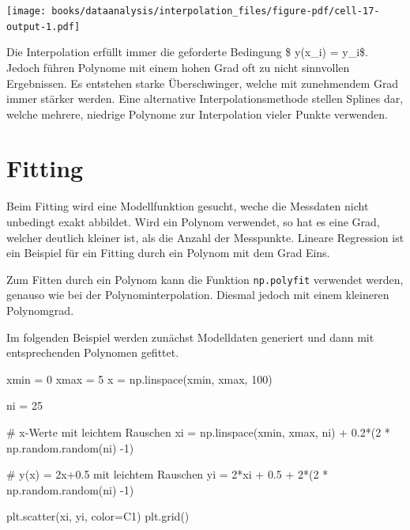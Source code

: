 \documentclass[
  letterpaper,
  DIV=11,
  numbers=noendperiod]{scrreprt}
\newenvironment{Shaded}{\begin{snugshade}}{\end{snugshade}}
\newcommand{\CommentTok}[1]{\textcolor[rgb]{0.37,0.37,0.37}{#1}}
\newcommand{\DecValTok}[1]{\textcolor[rgb]{0.68,0.00,0.00}{#1}}
\newcommand{\FloatTok}[1]{\textcolor[rgb]{0.68,0.00,0.00}{#1}}
\newcommand{\NormalTok}[1]{\textcolor[rgb]{0.00,0.23,0.31}{#1}}
\newcommand{\OperatorTok}[1]{\textcolor[rgb]{0.37,0.37,0.37}{#1}}
\newcommand{\StringTok}[1]{\textcolor[rgb]{0.13,0.47,0.30}{#1}}
\begin{document}
\texttt{[image: books/dataanalysis/interpolation\_files/figure-pdf/cell-17-output-1.pdf]}

Die Interpolation erfüllt immer die geforderte Bedingung \$ y(x\_i) =
y\_i\$. Jedoch führen Polynome mit einem hohen Grad oft zu nicht
sinnvollen Ergebnissen. Es entstehen starke Überschwinger, welche mit
zunehmendem Grad immer stärker werden. Eine alternative
Interpolationsmethode stellen Splines dar, welche mehrere, niedrige
Polynome zur Interpolation vieler Punkte verwenden.

\chapter{Fitting}\label{fitting}

Beim Fitting wird eine Modellfunktion gesucht, weche die Messdaten nicht
unbedingt exakt abbildet. Wird ein Polynom verwendet, so hat es eine
Grad, welcher deutlich kleiner ist, als die Anzahl der Messpunkte.
Lineare Regression ist ein Beispiel für ein Fitting durch ein Polynom
mit dem Grad Eins.

Zum Fitten durch ein Polynom kann die Funktion \texttt{np.polyfit}
verwendet werden, genauso wie bei der Polynominterpolation. Diesmal
jedoch mit einem kleineren Polynomgrad.

Im folgenden Beispiel werden zunächst Modelldaten generiert und dann mit
entsprechenden Polynomen gefittet.

\begin{Shaded}
\begin{Highlighting}[]
\NormalTok{xmin }\OperatorTok{=} \DecValTok{0}
\NormalTok{xmax }\OperatorTok{=} \DecValTok{5}
\NormalTok{x }\OperatorTok{=}\NormalTok{ np.linspace(xmin, xmax, }\DecValTok{100}\NormalTok{)}

\NormalTok{ni }\OperatorTok{=} \DecValTok{25}

\CommentTok{\# x{-}Werte mit leichtem Rauschen}
\NormalTok{xi }\OperatorTok{=}\NormalTok{ np.linspace(xmin, xmax, ni) }\OperatorTok{+} \FloatTok{0.2}\OperatorTok{*}\NormalTok{(}\DecValTok{2} \OperatorTok{*}\NormalTok{ np.random.random(ni) }\OperatorTok{{-}}\DecValTok{1}\NormalTok{)}

\CommentTok{\# y(x) = 2x+0.5 mit leichtem Rauschen}
\NormalTok{yi }\OperatorTok{=} \DecValTok{2}\OperatorTok{*}\NormalTok{xi }\OperatorTok{+} \FloatTok{0.5} \OperatorTok{+} \DecValTok{2}\OperatorTok{*}\NormalTok{(}\DecValTok{2} \OperatorTok{*}\NormalTok{ np.random.random(ni) }\OperatorTok{{-}}\DecValTok{1}\NormalTok{)}

\NormalTok{plt.scatter(xi, yi, color}\OperatorTok{=}\StringTok{\textquotesingle{}C1\textquotesingle{}}\NormalTok{)}
\NormalTok{plt.grid()}
\end{Highlighting}
\end{Shaded}
\end{document}

